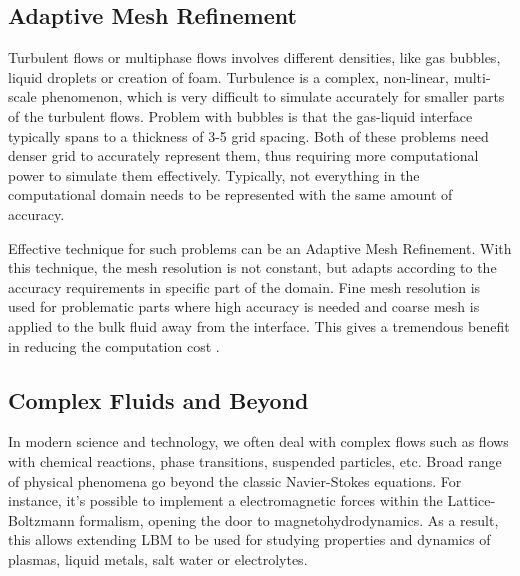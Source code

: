 %
%


\subsection{Adaptive Mesh Refinement}
Turbulent flows or multiphase flows involves different densities, like gas bubbles, liquid droplets or creation of foam. Turbulence is a complex, non-linear, multi-scale phenomenon, which is very difficult to simulate accurately for smaller parts of the turbulent flows. Problem with bubbles is that the gas-liquid interface typically spans to a thickness of 3-5 grid spacing. Both of these problems need denser grid to accurately represent them, thus requiring more computational power to simulate them effectively. Typically, not everything in the computational domain needs to be represented with the same amount of accuracy.

Effective technique for such problems can be an Adaptive Mesh Refinement. With this technique, the mesh resolution is not constant, but adapts according to the accuracy requirements in specific part of the domain. Fine mesh resolution is used for problematic parts where high accuracy is needed and coarse mesh is applied to the bulk fluid away from the interface. This gives a tremendous benefit in reducing the computation cost \citep{yuanAdaptiveMeshRefinementmultiphase2017}.

\subsection{Complex Fluids and Beyond}
In modern science and technology, we often deal with complex flows such as flows with chemical reactions, phase transitions, suspended particles, etc. Broad range of physical phenomena go beyond the classic Navier-Stokes equations. For instance, it's possible to implement a electromagnetic forces within the Lattice-Boltzmann formalism, opening the door to magnetohydrodynamics. As a result, this allows extending LBM to be used for studying properties and dynamics of plasmas, liquid metals, salt water or electrolytes.

